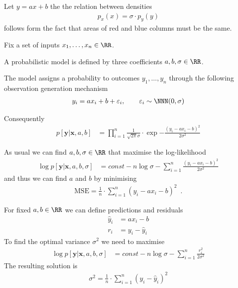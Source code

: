 \documentclass[landscape,footrule]{foils}
\renewcommand{\vec}[1]{\boldsymbol{#1}}
\begin{document}
Let $y=ax + b$ the the relation between densities 
\begin{align*}
p_x(x)=\sigma\cdot p_y(y)
\end{align*}
follows form the fact that areas of red and blue columns must be the same.





\begin{triangles}
\item Fix a set of inputs $x_1, \ldots, x_n\in \RR$. 
\item A probabilistic model is defined by three coefficients $a, b,\sigma\in\RR$.
\item The model assigns a probability to outcomes $y_1,\ldots, y_n$ through the following observation generation mechanism
\begin{align*}
  y_i=ax_i+b+\varepsilon_i,\qquad \varepsilon_i\sim\NNN(0,\sigma)
\end{align*}
\item Consequently 
\begin{align*}
  p[\vec{y}|\vec{x},a,b]&=\prod_{i=1}^n\frac{1}{\sqrt{2\pi}
    \sigma}\cdot\exp{-\frac{(y_i-ax_i-b)^2}{2\sigma^2}}
\end{align*}
\end{triangles}


As usual we can find  $a,b,\sigma\in\RR$ that maximise the log-likelihood
\begin{align*}
\log p[\vec{y}|\vec{x},a,b,\sigma]&= const -n\log \sigma-\sum_{i=1}^n\frac{(y_i-ax_i-b)^2}{2\sigma^2}
\end{align*}
and thus we can find $a$ and $b$ by minimising 
\begin{align*}
\text{MSE}=\frac{1}{n}\cdot \sum_{i=1}^n(y_i-ax_i-b)^2\enspace.
\end{align*}



For fixed $a, b\in\RR$ we can define predictions and residuals 
\begin{align*}
\hat{y}_i&= ax_i-b\\
r_i&=y_i-\hat{y}_i
\end{align*}
To find the optimal variance $\sigma^2$ we need to maximise
\begin{align*}
\log p[\vec{y}|\vec{x},a,b,\sigma]&= const -n\log \sigma-\sum_{i=1}^n\frac{r_i^2}{2\sigma^2}
\end{align*}
The resulting solution is 
\begin{align*}
\sigma^2=\frac{1}{n}\cdot \sum_{i=1}^n (y_i-\hat{y}_i)^2
\end{align*}
\end{document}
